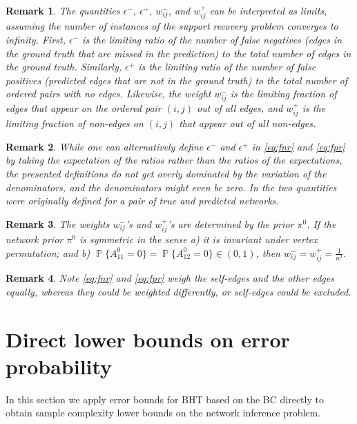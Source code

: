 \documentclass[conference,letterpaper]{IEEEtran}
\renewcommand{\Pr}{\operatorname{\mathbb P}}%
\newtheorem{remark}{Remark}
\newcommand{\trueAdjMat}{A^0}%
\newcommand{\fnrNet}{\epsilon^-}%
\newcommand{\fprNet}{\epsilon^+}%
\begin{document}
\begin{remark}
  The quantities $\fnrNet$, $\fprNet$, $w_{ij}^-$, and $w_{ij}^+$ can
  be interpreted as limits, assuming the number of instances of the
  support recovery problem converges to infinity. First, $\fnrNet$ is
  the limiting ratio of the number of false negatives (edges in the
  ground truth that are missed in the prediction) to the total number
  of edges in the ground truth.  Similarly, $\fprNet$ is the limiting
  ratio of the number of false positives (predicted edges that are not
  in the ground truth) to the total number of ordered pairs with no
  edges.  Likewise, the weight $w_{ij}^-$ is the limiting fraction of
  edges that appear on the ordered pair $(i, j)$ out of all edges, and
  $w_{ij}^+$ is the limiting fraction of non-edges on $(i, j)$ that
  appear out of all non-edges.
\end{remark}
\begin{remark}
  While one can alternatively define $\fnrNet$ and $\fprNet$ in
  \eqref{eq:fnr} and \eqref{eq:fpr} by taking the expectation of the
  ratios rather than the ratios of the expectations, the presented
  definitions do not get overly dominated by the variation of the
  denominators, and the denominators might even be zero.  In
  \cite{SunTaylorBollt15} the two quantities were originally defined
  for a pair of true and predicted networks.
\end{remark}
\begin{remark}
  \label{rem:symm}
  The weights $w_{ij}^-$'s and $w_{ij}^+$'s are determined by the
  prior $\pi^0$.  If the network prior $\pi^0$ is symmetric in the
  sense a) it is invariant under vertex permutation; and b)
  $\Pr\{\trueAdjMat_{11} = 0\} = \Pr\{\trueAdjMat_{12} = 0\}\in(0,
  1)$, then $w_{ij}^- = w_{ij}^+ = \frac 1{n^2}$.
\end{remark}
\begin{remark}
  Note \eqref{eq:fnr} and \eqref{eq:fpr} weigh the self-edges and the
  other edges equally, whereas they could be weighted differently, or
  self-edges could be excluded.
\end{remark}

\section{Direct lower bounds on error probability}
\label{sec:direct}
In this section we apply error bounds for BHT based on the BC directly
to obtain sample complexity lower bounds on the network inference
problem.
\end{document}
